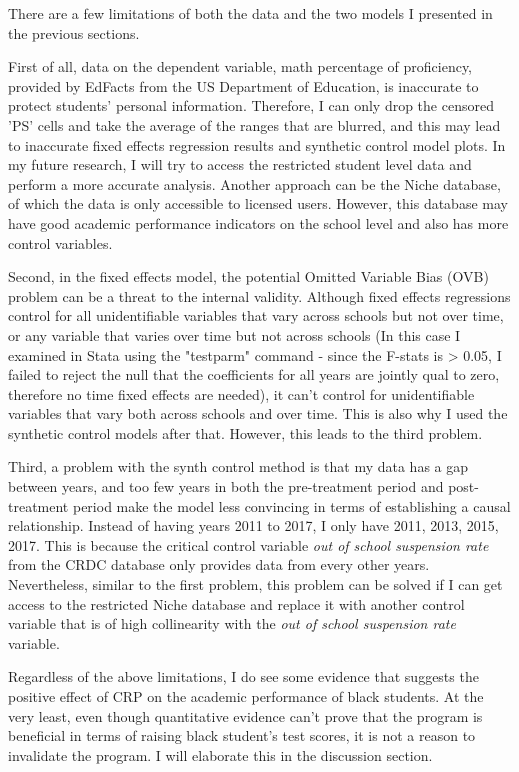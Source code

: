 There are a few limitations of both the data and the two models I presented in the previous sections.

First of all, data on the dependent variable, math percentage of proficiency, provided by EdFacts from the US Department of Education, is inaccurate to protect students' personal information. Therefore, I can only drop the censored 'PS' cells and take the average of the ranges that are blurred, and this may lead to inaccurate fixed effects regression results and synthetic control model plots. In my future research, I will try to access the restricted student level data and perform a more accurate analysis. Another approach can be the Niche database, of which the data is only accessible to licensed users. However, this database may have good academic performance indicators on the school level and also has more control variables.

Second, in the fixed effects model, the potential Omitted Variable Bias (OVB) problem can be a threat to the internal validity. Although fixed effects regressions control for all unidentifiable variables that vary across schools but not over time, or any variable that varies over time but not across schools (In this case I examined in Stata using the "testparm" command - since the F-stats is > 0.05, I failed to reject the null that the coefficients for all years are jointly qual to zero, therefore no time fixed effects are needed), it can't control for unidentifiable variables that vary both across schools and over time. This is also why I used the synthetic control models after that. However, this leads to the third problem.

Third, a problem with the synth control method is that my data has a gap between years, and too few years in both the pre-treatment period and post-treatment period make the model less convincing in terms of establishing a causal relationship. Instead of having years 2011 to 2017, I only have 2011, 2013, 2015, 2017. This is because the critical control variable \textit{out of school suspension rate} from the CRDC database only provides data from every other years. Nevertheless, similar to the first problem, this problem can be solved if I can get access to the restricted Niche database and replace it with another control variable that is of high collinearity with the \textit{out of school suspension rate} variable.

Regardless of the above limitations, I do see some evidence that suggests the positive effect of CRP on the academic performance of black students. At the very least, even though quantitative evidence can't prove that the program is beneficial in terms of raising black student's test scores, it is not a reason to invalidate the program. I will elaborate this in the discussion section.